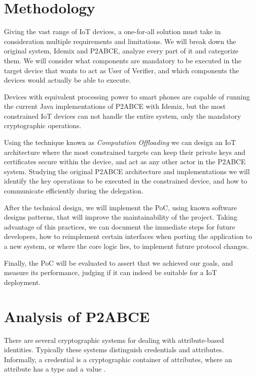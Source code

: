 \section{Methodology}

Giving the vast range of IoT devices, a one-for-all solution must take in consideration multiple requirements and limitations. We will break down the original system, Idemix and P2ABCE, analyze every part of it and categorize them. We will consider what components are mandatory to be executed in the target device that wants to act as User of Verifier, and which components the devices would actually be able to execute.

Devices with equivalent processing power to smart phones are capable of running the current Java implementations of P2ABCE with Idemix, but the most constrained IoT devices can not handle the entire system, only the mandatory cryptographic operations.

Using the technique known as \textit{Computation Offloading} we can design an IoT architecture where the most constrained targets can keep their private keys and certificates secure within the device, and act as any other actor in the P2ABCE system. Studying the original P2ABCE architecture and implementations we will identify the key operations to be executed in the constrained device, and how to communicate efficiently during the delegation.

After the technical design, we will implement the PoC, using known software designs patterns, that will improve the maintainability of the project. Taking advantage of this practices, we can document the immediate steps for future developers, how to reimplement certain interfaces when porting the application to a new system, or where the core logic lies, to implement future protocol changes.

Finally, the PoC will be evaluated to assert that we achieved our goals, and measure its performance, judging if it can indeed be suitable for a IoT deployment.



\section{Analysis of P2ABCE}\label{analysisP2ABCE}

There are several cryptographic systems for dealing with attribute-based
identities. Typically these systems distinguish credentials and attributes. Informally,
a credential is a cryptographic container of attributes, where an attribute has a type and a value \citep{vullers2013efficient}.

